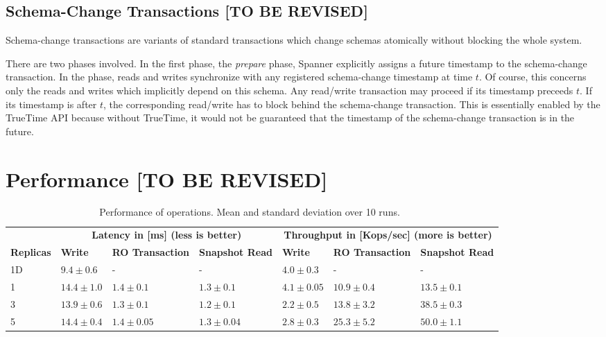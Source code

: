 \documentclass[onecolumn, a4paper, 10pt]{article}
\newcommand{\tbr}{{\color{red}\textbf{[TO BE REVISED]}}}
\begin{document}
\subsection{Schema-Change Transactions \tbr}
\label{subsec:schema-change-transactions}

Schema-change transactions are variants of standard transactions which change
schemas atomically without blocking the whole system.

There are two phases involved. In the first phase, the \emph{prepare} phase,
Spanner explicitly assigns a future timestamp to the schema-change transaction.
In the phase, reads and writes synchronize with any registered schema-change
timestamp at time $t$. Of course, this concerns only the reads and writes which
implicitly depend on this schema. Any read/write transaction may proceed if
its timestamp preceeds $t$. If its timestamp is after $t$, the corresponding
read/write has to block behind the schema-change transaction. This is essentially
enabled by the TrueTime API because without TrueTime, it would not be guaranteed
that the timestamp of the schema-change transaction is in the future.


\section{Performance \tbr}
\label{sec:performance}

\begin{table}[ht]
  \centering
  { \footnotesize
    \begin{tabular}{|l||l|l|l||l|l|l|}
      \hline
      & \multicolumn{3}{c||}{{\bfseries Latency in [ms] (less is better)}} &
      \multicolumn{3}{c|}{{\bfseries Throughput in [Kops/sec] (more is better)}}
      \tabularnewline
      \cline{2-7}
      {\bfseries Replicas} & {\bfseries Write} & {\bfseries RO Transaction} &
      {\bfseries Snapshot Read} & {\bfseries Write} &
      {\bfseries RO Transaction} & {\bfseries Snapshot Read} \tabularnewline
      \hline\hline
      1D & $9.4\pm0.6$ & - & - & $4.0\pm0.3$ & - & - \tabularnewline
      \hline
      1 & $14.4\pm1.0$ & $1.4\pm0.1$ & $1.3\pm0.1$ & $4.1\pm0.05$ &
      $10.9\pm0.4$ & $13.5\pm0.1$ \tabularnewline
      \hline
      3 & $13.9\pm0.6$ & $1.3\pm0.1$ & $1.2\pm0.1$ & $2.2\pm0.5$ &
      $13.8\pm3.2$ & $38.5\pm0.3$ \tabularnewline
      \hline
      5 & $14.4\pm0.4$ & $1.4\pm0.05$ & $1.3\pm0.04$ & $2.8\pm0.3$ &
      $25.3\pm5.2$ & $50.0\pm1.1$ \tabularnewline
      \hline
    \end{tabular}
  }
  \caption{Performance of operations. Mean and standard deviation over 10
    runs.~\cite{Corbett:2012}
  }
  \label{tbl:performance-of-operations}
\end{table}
\end{document}
